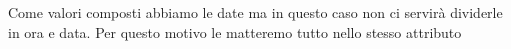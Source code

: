 Come valori composti abbiamo le date ma in questo caso  non ci servirà dividerle in ora e data. Per questo motivo le matteremo tutto nello stesso attributo